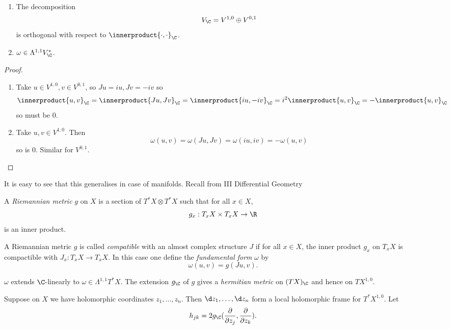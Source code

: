 \documentclass[a4paper]{article}
\newcommand*{\ip}{\innerproduct}
\begin{document}
\begin{lemma}\leavevmode
  \begin{enumerate}
  \item The decomposition
    \[
      V_\C = V^{1, 0} \oplus V^{0, 1}
    \]
    is orthogonal with respect to \(\ip{\cdot, \cdot}_\C\).
  \item \(\omega \in \Lambda^{1, 1} V_\C^*\).
  \end{enumerate}
\end{lemma}

\begin{proof}\leavevmode
  \begin{enumerate}
  \item Take \(u \in V^{1, 0}, v \in V^{0, 1}\), so \(Ju = iu, Jv = -iv\) so
    \[
      \ip{u, v}_\C
      = \ip{Ju, Jv}_\C
      = \ip{iu, -iv}_\C
      = i^2 \ip{u, v}_\C
      = -\ip{u, v}_\C
    \]
    so must be \(0\).
  \item Take \(u, v \in V^{1, 0}\). Then
    \[
      \omega(u, v)
      = \omega(Ju, Jv)
      = \omega(iu, iv)
      = -\omega(u, v)
    \]
    so is \(0\). Similar for \(V^{0, 1}\).
  \end{enumerate}
\end{proof}

It is easy to see that this generalises in case of manifolds. Recall from III Differential Geometry

\begin{definition}
  A \emph{Riemannian metric} \(g\) on \(X\) is a section of \(T^*X \otimes T^*X\) such that for all \(x \in X\),
  \[
    g_x: T_xX \times T_xX \to \R
  \]
  is an inner product.
\end{definition}

\begin{definition}
  A Riemannian metric \(g\) is called \emph{compatible} with an almost complex structure \(J\) if for all \(x \in X\), the inner product \(g_x\) on \(T_xX\) is compactible with \(J_x: T_xX \to T_xX\). In this case one define the \emph{fundamental form} \(\omega\) by
  \[
    \omega(u, v) = g(Ju, v).
  \]
\end{definition}
\(\omega\) extends \(\C\)-linearly to \(\omega \in \Lambda^{1, 1} T^*X\). The extension \(g_\C\) of \(g\) gives a \emph{hermitian metric} on \((TX)_\C\) and hence on \(TX^{1, 0}\).

Suppose on \(X\) we have holomorphic coordinates \(z_1, \dots, z_n\). Then \(\d z_1, \dots, \d z_n\) form a local holomorphic frame for \(T^*X^{1, 0}\). Let
\[
  h_{jk} = 2 g_\C(\frac{\partial  }{\partial z_j}, \frac{\partial  }{\partial z_k}).
\]
\end{document}
